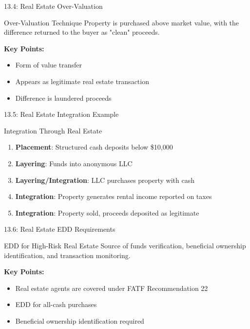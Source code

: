 \documentclass{beamer}
\begin{document}
	\begin{frame}{13.4: Real Estate Over-Valuation}
		\begin{block}{Over-Valuation Technique}
			Property is purchased above market value, with the difference returned to the buyer as "clean" proceeds.
		\end{block}
		\textbf{Key Points:}
		\begin{itemize}
			\item Form of value transfer
			\item Appears as legitimate real estate transaction
			\item Difference is laundered proceeds
		\end{itemize}
	\end{frame}
	
	\begin{frame}{13.5: Real Estate Integration Example}
		\begin{block}{Integration Through Real Estate}
			\begin{enumerate}
				\item \textbf{Placement}: Structured cash deposits below \$10,000
				\item \textbf{Layering}: Funds into anonymous LLC
				\item \textbf{Layering/Integration}: LLC purchases property with cash
				\item \textbf{Integration}: Property generates rental income reported on taxes
				\item \textbf{Integration}: Property sold, proceeds deposited as legitimate
			\end{enumerate}
		\end{block}
	\end{frame}
	
	\begin{frame}{13.6: Real Estate EDD Requirements}
		\begin{block}{EDD for High-Risk Real Estate}
			Source of funds verification, beneficial ownership identification, and transaction monitoring.
		\end{block}
		\textbf{Key Points:}
		\begin{itemize}
			\item Real estate agents are covered under FATF Recommendation 22
			\item EDD for all-cash purchases
			\item Beneficial ownership identification required
		\end{itemize}
	\end{frame}
	
\end{document}
